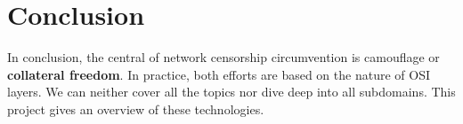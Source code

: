 
\section{Conclusion}
\begin{frame}
    In conclusion, the central of network censorship circumvention is camouflage or \textbf{collateral freedom}. In practice, both efforts are based on the nature of OSI layers.
    We can neither cover all the topics nor dive deep into all subdomains. This project gives an overview of these technologies.
\end{frame}

